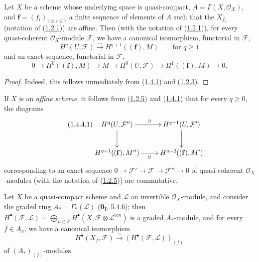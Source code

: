 \begin{corollary}[1.4.3]
\label{III.1.4.3}
Let $X$ be a scheme whose underlying space is quasi-compact,
$A=\Gamma(X,\mathcal O_X)$, and $\mathbf f=(f_i)_{1\leq i\leq r}$ a finite
sequence of elements of $A$ such that the $X_{f_i}$ (notation of
\textup{(\hyperref[III.1.2.1]{1.2.1})}) are affine. Then (with the notation
of \textup{(\hyperref[III.1.2.1]{1.2.1})}), for every quasi-coherent
$\mathcal O_X$-module $\mathcal F$, we have a canonical isomorphism,
functorial in $\mathcal F$,
\begin{equation}
\label{III.1.4.3.1}
\tag{1.4.3.1}
H^q(U,\mathcal F)\xrightarrow{\sim}H^{q+1}((\mathbf f),M)
\qquad\text{for }q\geq1
\end{equation}
and an exact sequence, functorial in $\mathcal F$,
\begin{equation}
\label{III.1.4.3.2}
\tag{1.4.3.2}
0\longrightarrow H^0((\mathbf f),M)\longrightarrow M
\longrightarrow H^0(U,\mathcal F)
\longrightarrow H^1((\mathbf f),M)\longrightarrow0.
\end{equation}
\end{corollary}

\begin{proof}
Indeed, this follows immediately from
(\hyperref[III.1.4.1]{1.4.1}) and
(\hyperref[III.1.2.3]{1.2.3}).
\end{proof}

\begin{env}[1.4.4]
\label{III.1.4.4}
If $X$ is an \emph{affine scheme}, it follows from
(\hyperref[III.1.2.5]{1.2.5}) and
(\hyperref[III.1.4.1]{1.4.1}) that for every $q\geq0$, the diagrams
\begin{equation}
\label{III.1.4.4.1}
\tag{1.4.4.1}
\xymatrix{
H^q(U,\mathcal F'')\ar[r]^{\partial}\ar[d]
&H^{q+1}(U,\mathcal F')\ar[d]\\
H^{q+1}((\mathbf f),M'')\ar[r]_{\partial}
&H^{q+2}((\mathbf f),M')
}
\end{equation}
corresponding to an exact sequence
$0\to\mathcal F'\to\mathcal F\to\mathcal F''\to0$ of quasi-coherent
$\mathcal O_X$-modules (with the notation of
(\hyperref[III.1.2.5]{1.2.5})) are commutative.
\end{env}

\begin{proposition}[1.4.5]
\label{III.1.4.5}
Let $X$ be a quasi-compact scheme and $\mathcal L$ an invertible
$\mathcal O_X$-module, and consider the graded ring
$A_*=\Gamma_*(\mathcal L)$ \textup{(\textbf{0}\textsubscript{I}, 5.4.6)}; then $H^\bullet(\mathcal F,\mathcal L)
=\bigoplus_{n\in\mathbb Z}H^\bullet(X,\mathcal F\otimes\mathcal L^{\otimes n})$
is a graded $A_*$-module, and for every $f\in A_n$, we have a
canonical isomorphism
\begin{equation}
\label{III.1.4.5.1}
\tag{1.4.5.1}
H^\bullet(X_f,\mathcal F)
\xrightarrow{\sim}(H^\bullet(\mathcal F,\mathcal L))_{(f)}
\end{equation}
of $(A_*)_{(f)}$-modules.
\end{proposition}

